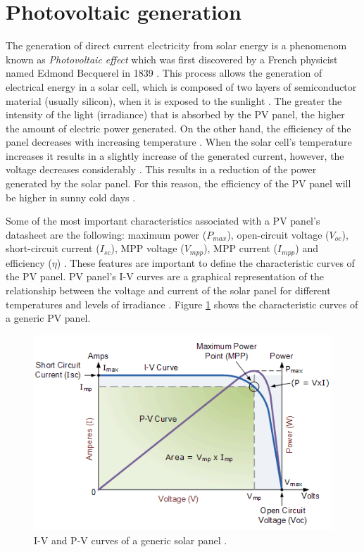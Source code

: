 \section{Photovoltaic generation}

The generation of direct current electricity from solar energy is a phenomenom known as \textit{Photovoltaic effect} which was first discovered by a French physicist named Edmond Becquerel in 1839 \cite{PVeffect}. This process allows the generation of electrical energy in a solar cell, which is composed of two layers of semiconductor material (usually silicon), when it is exposed to the sunlight \cite{PVeffect}. The greater the intensity of the light (irradiance) that is absorbed by the PV panel, the higher the amount of electric power generated. On the other hand, the efficiency of the panel decreases with increasing temperature \cite{handbook}. When the solar cell's temperature increases it results in a slightly increase of the generated current, however, the voltage decreases considerably \cite{handbook}. This results in a reduction of the power generated by the solar panel. For this reason, the efficiency of the PV panel will be higher in sunny cold days . 

Some of the most important characteristics associated with a PV panel’s datasheet are the following: maximum power ($P_{max}$), open-circuit voltage ($V_{oc}$), short-circuit current ($I_{sc}$), MPP voltage ($V_{mpp}$), MPP current ($I_{mpp}$) and efficiency ($\eta$) \cite{handbook}.  %
These features are important to define the characteristic curves of the PV panel. PV panel's I-V curves are a graphical representation of the relationship between the voltage and current of the solar panel for different temperatures and levels of irradiance \cite{IVcurves}. Figure \ref{fig:mpp} shows the characteristic curves of a generic PV panel. 

\begin{figure}[H]
	\begin{center}
		\includegraphics[width=0.8\linewidth]{../Pictures/IVcurve1}
		\caption{I-V and P-V curves of a generic solar panel \cite{IVcurves}.}
		\label{fig:mpp}
	\end{center}
\end{figure}


